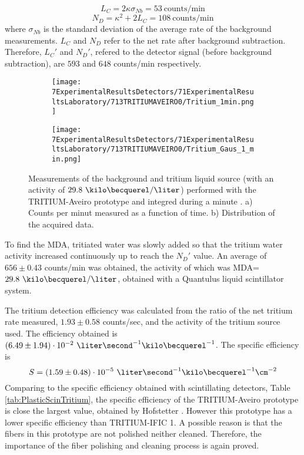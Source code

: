 \begin{equation}
L_C = 2\kappa\sigma_{Nb} =53 ~\text{counts/min}
\label{eq:EquationCriticalLimit}
\end{equation}
\begin{equation}
N_D = \kappa^2 + 2L_C = 108~\text{counts/min}
\label{eq:EquationNetCounts}
\end{equation}
where $\sigma_{Nb}$ is the standard deviation of the average rate of the background measurements. $L_C$ and $N_D$ refer to the net rate after background subtraction. Therefore, $L_C'$ and $N_D'$, refered to the detector signal (before background subtraction), are $593$ and $648$ counts/min respectively.

\begin{figure}
\centering
    \begin{subfigure}[b]{0.45\textwidth}
    \centering
    \texttt{[image: 7ExperimentalResultsDetectors/71ExperimentalResultsLaboratory/713TRITIUMAVEIRO0/Tritium\_1min.png]}  
    \caption{\label{subfig:MeasurementInRealTime}}
    \end{subfigure}
    \hfill
    \begin{subfigure}[b]{0.45\textwidth}
    \centering
    \texttt{[image: 7ExperimentalResultsDetectors/71ExperimentalResultsLaboratory/713TRITIUMAVEIRO0/Tritium\_Gaus\_1\_min.png]}  
    \caption{\label{subfig:DistributionofMeasurement}}
    \end{subfigure}
 \caption{Measurements of the background and tritium liquid source (with an activity of $29.8~\kilo\becquerel/\liter$) performed with the TRITIUM-Aveiro prototype and integred during a minute \cite{ExperimentalPaperCarlos}. a) Counts per minut measured as a function of time. b) Distribution of the acquired data.}
 \label{fig:BackgroundTritium1min}
\end{figure}

To find the MDA, tritiated water was slowly added  so that the tritium water activity increased continuously up to reach the $N_D'$ value. An average of $656 \pm 0.43$ counts/min was obtained, the activity of which was MDA=$29.8~\kilo\becquerel/\liter$, obtained with a Quantulus liquid scintillator system.

The tritium detection efficiency was calculated from the ratio of the net tritium rate measured, $1.93 \pm 0.58$ counts/sec, and the activity of the tritium source used. The efficiency obtained is $(6.49 \pm 1.94)\cdot{} 10^{-2}~\liter\second^{-1}\kilo\becquerel^{-1}$.  The specific efficiency is
$$S=(1.59 \pm 0.48)\cdot{} 10^{-5}~\liter\second^{-1}\kilo\becquerel^{-1}\cm^{-2}$$ 
Comparing to the specific efficiency obtained with scintillating detectors, Table \ref{tab:PlasticScinTritium}, the specific efficiency of the TRITIUM-Aveiro prototype is close the largest value, obtained by Hofstetter \cite{Hofstetter1, Hofstetter2}. However this prototype has a lower specific efficiency than TRITIUM-IFIC 1. A possible reason is that the fibers in this prototype are not polished neither cleaned. Therefore, the importance of the fiber polishing and cleaning process is again proved.

